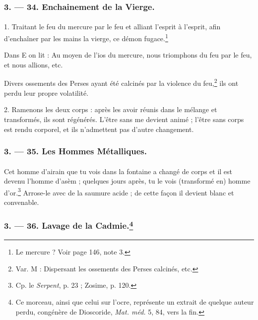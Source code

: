 \documentclass[landscape, a4paper, 11pt, oneside, polutonikogreek, french]{article}
\begin{document}
\bigskip
\centerline{\EightStarTaper}
\centerline{\EightStarTaper\EightStarTaper}
\bigskip

\subsubsection{3. --- 34. Enchainement de la Vierge.}
\paragraph{}
1. Traitant le feu du mercure par le feu et alliant l'esprit à l'esprit, afin d'enchaîner par les mains la vierge, ce démon fugace.\footnote{Le mercure ? Voir page 146, note 3.  }

Dans E on lit : Au moyen de l'ios du mercure, nous triomphons du feu par le feu, et nous allions, etc.

Divers ossements des Perses ayant été calcinés par la violence du feu,\footnote{Var. M : Dispersant les ossements des Perses calcinés, etc.} ils ont perdu leur propre volatilité.

2. Ramenons les deux corps : après les avoir réunis dans le mélange et transformés, ils sont régénérés. L'être sans me devient animé ; l'être sans corps est rendu corporel, et ils n'admettent pas d'autre changement.

\bigskip
\centerline{\EightStarTaper}
\centerline{\EightStarTaper\EightStarTaper}
\bigskip

\subsubsection{3. --- 35. Les Hommes Métalliques.}
\paragraph{}
Cet homme d'airain que tu vois dans la fontaine a changé de corps et il est devenu l'homme d'asèm ; quelques jours après, tu le vois (transformé en) homme d'or.\footnote{Cp. le \emph{Serpent}, p. 23 ; Zosime, p. 120.} Arrose-le avec de la saumure acide ; de cette façon il devient blanc et convenable.

\bigskip
\centerline{\EightStarTaper}
\centerline{\EightStarTaper\EightStarTaper}
\bigskip

\subsubsection[3. --- 36. Lavage de la Cadmie.]{3. --- 36. Lavage de la Cadmie.\footnote{Ce morceau, ainsi que celui sur l'ocre, représente un extrait de quelque auteur perdu, congénère de Dioscoride, \emph{Mat. méd.} 5, 84, vers la fin.}}
\end{document}
